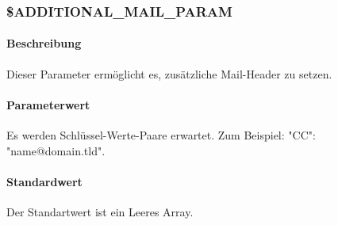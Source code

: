 \subsubsection{\$ADDITIONAL\_MAIL\_PARAM} \label{config:additional-mail-header}
\paragraph{Beschreibung}Dieser Parameter ermöglicht es, zusätzliche Mail-Header zu setzen.
\paragraph{Parameterwert}Es werden Schlüssel-Werte-Paare erwartet. Zum Beispiel: "CC": "name@domain.tld".
\paragraph{Standardwert}Der Standartwert ist ein Leeres Array.